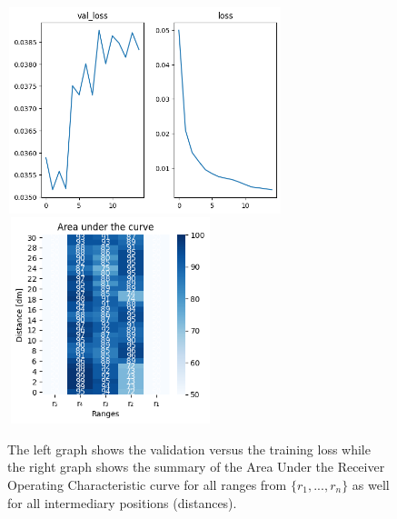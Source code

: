 \begin{multicols}{2}
\end{multicols}\begin{figure}[H]%
\centering
\includegraphics[width=8cm,height=6cm]{3_models/models_7/graph_7.png}
\hspace{0.2 cm}
\includegraphics[width=6cm,height=6cm]{4_plots/plots_7/AUC_7.png}
\caption{The left graph shows the validation versus the training loss while the right graph shows the summary of the Area Under the Receiver Operating Characteristic curve for all ranges from $\{r_{1}, ... ,r_{n}\}$ as well for all intermediary positions (distances).}
\label{auc_7}
\end{figure}

\newpage
